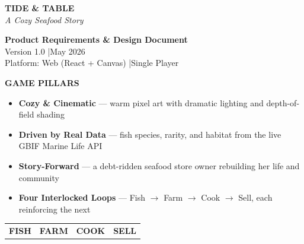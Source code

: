 \documentclass[11pt, letterpaper]{article}
\begin{document}

\thispagestyle{empty}

\vspace*{3cm}

\begin{center}
  {\fontsize{52}{56}\selectfont\bfseries\color{teal}TIDE \& TABLE}\\[8pt]
  {\Large\itshape\color{gold}A Cozy Seafood Story}\\[30pt]

  \begin{tcolorbox}[
    enhanced,
    colback=teallight, colframe=teal,
    boxrule=1pt, arc=4pt,
    width=0.75\textwidth,
    halign=center,
    left=16pt, right=16pt, top=12pt, bottom=12pt,
  ]
    {\large\bfseries\color{slate}Product Requirements \& Design Document}\\[6pt]
    {\normalsize\color{darkgray}Version 1.0 \quad|\quad May 2026}\\[4pt]
    {\small\color{darkgray}Platform: Web (React + Canvas) \quad|\quad Single Player}
  \end{tcolorbox}

  \vspace{20pt}

  {\large\bfseries\color{slate}GAME PILLARS}\\[8pt]
  \begin{minipage}{0.82\textwidth}
    \begin{itemize}
      \item \textbf{Cozy \& Cinematic} --- warm pixel art with dramatic lighting and depth-of-field shading
      \item \textbf{Driven by Real Data} --- fish species, rarity, and habitat from the live GBIF Marine Life API
      \item \textbf{Story-Forward} --- a debt-ridden seafood store owner rebuilding her life and community
      \item \textbf{Four Interlocked Loops} --- Fish $\rightarrow$ Farm $\rightarrow$ Cook $\rightarrow$ Sell, each reinforcing the next
    \end{itemize}
  \end{minipage}

  \vspace{28pt}

  \begin{tabular}{C{3.6cm} C{3.6cm} C{3.6cm} C{3.6cm}}
    {\large\bfseries\color{teal}FISH} &
    {\large\bfseries\color{green}FARM} &
    {\large\bfseries\color{gold}COOK} &
    {\large\bfseries\color{coral}SELL} \\[6pt]
  \end{tabular}
\end{center}
\end{document}
